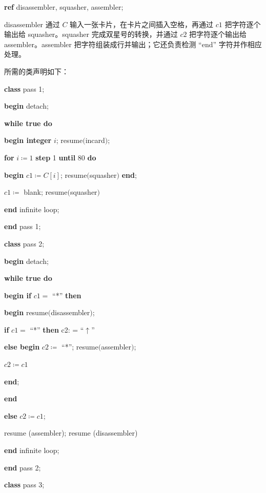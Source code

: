 \documentclass[twoside,11pt,fontset=none]{ctexbook}
\begin{document}
\quad \textbf{ref} disassembler, squasher, assembler;

disassembler 通过 $C$ 输入一张卡片，在卡片之间插入空格，再通过 $c1$ 把字符逐个输出给 squasher。squasher 完成双星号的转换，并通过 $c2$ 把字符逐个输出给 assembler。assembler 把字符组装成行并输出；它还负责检测 ``end'' 字符并作相应处理。

所需的类声明如下：

\quad \textbf{class} pass 1;

\quad \textbf{begin} detach;

\quad \quad \textbf{while true do}

\quad \quad \quad \textbf{begin integer} $i$; resume$($incard$)$;

\quad \quad \quad \quad \textbf{for} $i\coloneq 1$ \textbf{step} 1 \textbf{until} 80 \textbf{do}

\quad \quad \quad \quad \quad \textbf{begin} $c1\coloneq C[i]$; resume$($squasher$)$ \textbf{end};

\quad \quad \quad \quad $c1\coloneq$ blank; resume$($squasher$)$

\quad \quad \quad \textbf{end} infinite loop;

\quad \textbf{end} pass 1;

\quad \textbf{class} pass 2;

\quad \textbf{begin} detach;

\quad \quad \textbf{while true do}

\quad \quad \quad \textbf{begin if} $c1 =$ ``*'' \textbf{then}

\quad \quad \quad \quad \textbf{begin} resume$($disassembler$)$;

\quad \quad \quad \quad \quad \textbf{if} $c1 =$ ``*'' \textbf{then} c2: = ``$\uparrow$''

\quad \quad \quad \quad \quad \textbf{else begin} $c2 \coloneq$ ``*''; resume$($assembler$)$;

\quad \quad \quad \quad \quad \quad $c2\coloneq c1$

\quad \quad \quad \quad \quad \textbf{end};

\quad \quad \quad \quad \textbf{end}

\quad \quad \quad \textbf{else} $c2\coloneq c1$;

\quad \quad \quad resume (assembler); resume (disassembler)

\quad \textbf{end} infinite loop;

\quad \textbf{end} pass 2;

\quad \textbf{class} pass 3;
\end{document}
